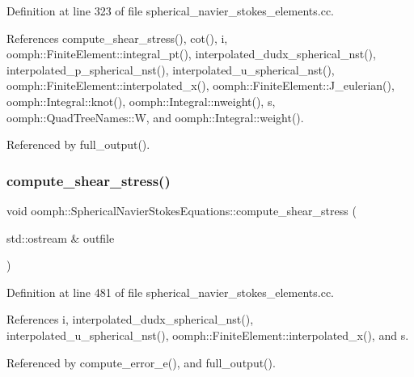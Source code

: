 Definition at line 323 of file spherical\+\_\+navier\+\_\+stokes\+\_\+elements.\+cc.



References compute\+\_\+shear\+\_\+stress(), cot(), i, oomph\+::\+Finite\+Element\+::integral\+\_\+pt(), interpolated\+\_\+dudx\+\_\+spherical\+\_\+nst(), interpolated\+\_\+p\+\_\+spherical\+\_\+nst(), interpolated\+\_\+u\+\_\+spherical\+\_\+nst(), oomph\+::\+Finite\+Element\+::interpolated\+\_\+x(), oomph\+::\+Finite\+Element\+::\+J\+\_\+eulerian(), oomph\+::\+Integral\+::knot(), oomph\+::\+Integral\+::nweight(), s, oomph\+::\+Quad\+Tree\+Names\+::W, and oomph\+::\+Integral\+::weight().



Referenced by full\+\_\+output().

\mbox{\label{classoomph_1_1SphericalNavierStokesEquations_a9a3bcc802ec26bc110d1f16d4f88d966}} 
\subsubsection{\texorpdfstring{compute\+\_\+shear\+\_\+stress()}{compute\_shear\_stress()}}
{\footnotesize\ttfamily void oomph\+::\+Spherical\+Navier\+Stokes\+Equations\+::compute\+\_\+shear\+\_\+stress (\begin{DoxyParamCaption}\item[{std\+::ostream \&}]{outfile }\end{DoxyParamCaption})}



Definition at line 481 of file spherical\+\_\+navier\+\_\+stokes\+\_\+elements.\+cc.



References i, interpolated\+\_\+dudx\+\_\+spherical\+\_\+nst(), interpolated\+\_\+u\+\_\+spherical\+\_\+nst(), oomph\+::\+Finite\+Element\+::interpolated\+\_\+x(), and s.



Referenced by compute\+\_\+error\+\_\+e(), and full\+\_\+output().

\mbox{\label{classoomph_1_1SphericalNavierStokesEquations_a8a160b5a04c9ba5bab06f3b2b184499f}} 
